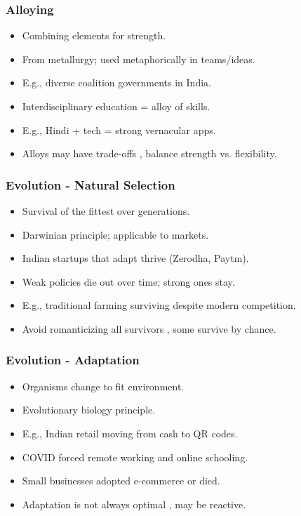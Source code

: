 \begin{frame}[fragile]\frametitle{Alloying}
  \begin{itemize}
    \item Combining elements for strength.
    \item From metallurgy; used metaphorically in teams/ideas.
    \item E.g., diverse coalition governments in India.
    \item Interdisciplinary education = alloy of skills.
    \item E.g., Hindi + tech = strong vernacular apps.
    \item Alloys may have trade-offs , balance strength vs. flexibility.
  \end{itemize}
\end{frame}

\begin{frame}[fragile]\frametitle{Evolution - Natural Selection}
  \begin{itemize}
    \item Survival of the fittest over generations.
    \item Darwinian principle; applicable to markets.
    \item Indian startups that adapt thrive (Zerodha, Paytm).
    \item Weak policies die out over time; strong ones stay.
    \item E.g., traditional farming surviving despite modern competition.
    \item Avoid romanticizing all survivors , some survive by chance.
  \end{itemize}
\end{frame}

\begin{frame}[fragile]\frametitle{Evolution - Adaptation}
  \begin{itemize}
    \item Organisms change to fit environment.
    \item Evolutionary biology principle.
    \item E.g., Indian retail moving from cash to QR codes.
    \item COVID forced remote working and online schooling.
    \item Small businesses adopted e-commerce or died.
    \item Adaptation is not always optimal , may be reactive.
  \end{itemize}
\end{frame}

